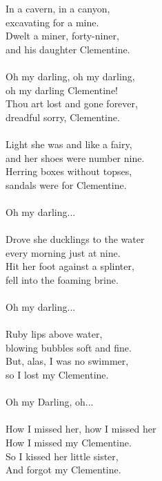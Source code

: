
In a cavern, in a canyon, \\ excavating for a mine. \\ Dwelt a miner, forty-niner, \\ and his daughter Clementine. \\ \hspace{10mm} \\ Oh my darling, oh my darling, \\ oh my darling Clementine! \\ Thou art lost and gone forever, \\ dreadful sorry, Clementine. \\ \hspace{10mm} \\ Light she was and like a fairy, \\ and her shoes were number nine. \\ Herring boxes without topses, \\ sandals were for Clementine. \\ \hspace{10mm} \\ Oh my darling... \\ \hspace{10mm} \\ Drove she ducklings to the water \\ every morning just at nine. \\ Hit her foot against a splinter, \\ fell into the foaming brine. \\ \hspace{10mm} \\ Oh my darling... \\ \hspace{10mm} \\ Ruby lips above water, \\ blowing bubbles soft and fine. \\ But, alas, I was no swimmer, \\ so I lost my Clementine. \\ \hspace{10mm} \\ Oh my Darling, oh... \\ \hspace{10mm} \\ How I missed her, how I missed her \\ How I missed my Clementine. \\ So I kissed her little sister, \\ And forgot my Clementine.